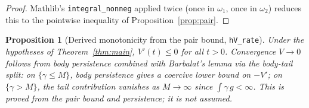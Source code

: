 \documentclass[11pt,a4paper]{article}
\newtheorem{proposition}[theorem]{Proposition}
\theoremstyle{definition}
\begin{document}
\begin{proof}
Mathlib's \texttt{integral\_nonneg} applied twice (once in $\omega_1$, once in $\omega_2$) reduces this to the pointwise inequality of Proposition~\ref{prop:pair}.
\end{proof}

\begin{proposition}[Derived monotonicity from the pair bound, \texttt{hV\_rate}]\label{prop:rate}
Under the hypotheses of Theorem~\ref{thm:main}, $V'(t) \leq 0$ for all $t > 0$. Convergence $V \to 0$ follows from body persistence combined with Barbalat's lemma via the body-tail split: on $\{\gamma \leq M\}$, body persistence gives a coercive lower bound on $-V'$; on $\{\gamma > M\}$, the tail contribution vanishes as $M \to \infty$ since $\int \gamma\,g < \infty$. This is \emph{proved} from the pair bound and persistence; it is not assumed.
\end{proposition}
\end{document}

